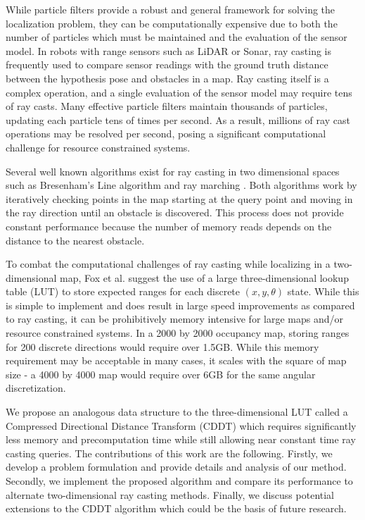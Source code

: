 \documentclass[letterpaper, 10 pt, conference]{ieeeconf}  %
\begin{document}
While particle filters provide a robust and general framework for solving the localization problem, they can be computationally expensive due to both the number of particles which must be maintained and the evaluation of the sensor model. In robots with range sensors such as LiDAR or Sonar, ray casting is frequently used to compare sensor readings with the ground truth distance between the hypothesis pose and obstacles in a map. Ray casting itself is a complex operation, and a single evaluation of the sensor model may require tens of ray casts. Many effective particle filters maintain thousands of particles, updating each particle tens of times per second. As a result, millions of ray cast operations may be resolved per second, posing a significant computational challenge for resource constrained systems.

Several well known algorithms exist for ray casting in two dimensional spaces such as Bresenham's Line algorithm \cite{bresenham} and ray marching \cite{raymarching}. Both algorithms work by iteratively checking points in the map starting at the query point and moving in the ray direction until an obstacle is discovered. This process does not provide constant performance because the number of memory reads depends on the distance to the nearest obstacle.

To combat the computational challenges of ray casting while localizing in a two-dimensional map, Fox et al. \cite{localization} suggest the use of a large three-dimensional lookup table (LUT) to store expected ranges for each discrete $(x,y,\theta)$ state. While this is simple to implement and does result in large speed improvements as compared to ray casting, it can be prohibitively memory intensive for large maps and/or resource constrained systems. In a 2000 by 2000 occupancy map, storing ranges for 200 discrete directions would require over 1.5GB. While this memory requirement may be acceptable in many cases, it scales with the square of map size - a 4000 by 4000 map would require over 6GB for the same angular discretization.

We propose an analogous data structure to the three-dimensional LUT called a Compressed Directional Distance Transform (CDDT) which requires significantly less memory and precomputation time while still allowing near constant time ray casting queries. The contributions of this work are the following. Firstly, we develop a problem formulation and provide details and analysis of our method. Secondly, we implement the proposed algorithm and compare its performance to alternate two-dimensional ray casting methods. Finally, we discuss potential extensions to the CDDT algorithm which could be the basis of future research. 
\end{document}
